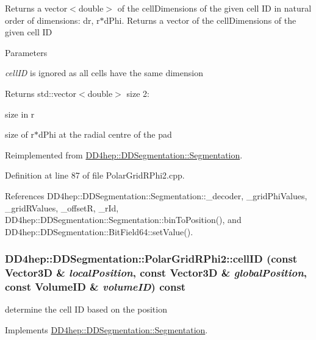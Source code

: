 Returns a vector$<$double$>$ of the cellDimensions of the given cell ID in natural order of dimensions: dr, r$\ast$dPhi. Returns a vector of the cellDimensions of the given cell ID 
\begin{DoxyParams}{Parameters}
\item[{\em cellID}]is ignored as all cells have the same dimension \end{DoxyParams}
\begin{DoxyReturn}{Returns}
std::vector$<$double$>$ size 2:
\begin{DoxyEnumerate}
\item size in r
\item size of r$\ast$dPhi at the radial centre of the pad 
\end{DoxyEnumerate}
\end{DoxyReturn}


Reimplemented from \hyperlink{class_d_d4hep_1_1_d_d_segmentation_1_1_segmentation_a9710f4942d7f6b52ae5342652e17c88d}{DD4hep::DDSegmentation::Segmentation}.

Definition at line 87 of file PolarGridRPhi2.cpp.

References DD4hep::DDSegmentation::Segmentation::\_\-decoder, \_\-gridPhiValues, \_\-gridRValues, \_\-offsetR, \_\-rId, DD4hep::DDSegmentation::Segmentation::binToPosition(), and DD4hep::DDSegmentation::BitField64::setValue().\hypertarget{class_d_d4hep_1_1_d_d_segmentation_1_1_polar_grid_r_phi2_ae1cd15b95add489ababb51f9103de6b4}{
\subsubsection[{cellID}]{ DD4hep::DDSegmentation::PolarGridRPhi2::cellID (const {\bf Vector3D} \& {\em localPosition}, \/  const {\bf Vector3D} \& {\em globalPosition}, \/  const {\bf VolumeID} \& {\em volumeID}) const}}
\label{class_d_d4hep_1_1_d_d_segmentation_1_1_polar_grid_r_phi2_ae1cd15b95add489ababb51f9103de6b4}


determine the cell ID based on the position 

Implements \hyperlink{class_d_d4hep_1_1_d_d_segmentation_1_1_segmentation_ad5a60953d96d409850d8192f64f8ce3c}{DD4hep::DDSegmentation::Segmentation}.

